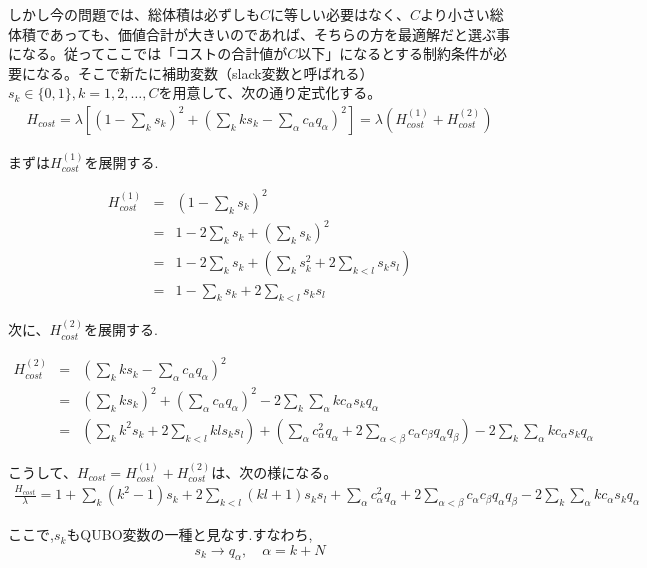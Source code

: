 \documentclass[uplatex,dvipdfmx,a4paper,11pt,oneside,openany]{jsbook}
\begin{document}
しかし今の問題では、総体積は必ずしも$C$に等しい必要はなく、$C$より小さい総体積であっても、価値合計が大きいのであれば、そちらの方を最適解だと選ぶ事になる。従ってここでは「コストの合計値が$C$以下」になるとする制約条件が必要になる。そこで新たに補助変数（slack変数と呼ばれる）$s_k \in \{0, 1\}, k=1,2,\dots,C$を用意して、次の通り定式化する。
\begin{eqnarray}
  H_{cost} = \lambda \left[\left(1-\sum_k s_k\right)^2+\left(\sum_k ks_k - \sum_\alpha c_\alpha q_\alpha\right)^2\right] = \lambda\left(H_{cost}^{(1)} + H_{cost}^{(2)}\right)
\end{eqnarray}

まずは$H_{cost}^{(1)}$を展開する.

\begin{eqnarray*}
H_{cost}^{(1)}&=&\left(1-\sum_k s_k\right)^2\\
&=&1-2\sum_k s_k + \left(\sum_k s_k\right)^2\\
&=&1-2\sum_k s_k + \left(\sum_k s_k^2 + 2\sum_{k<l}s_k s_l\right)\\
&=&1-\sum_k s_k + 2\sum_{k<l}s_k s_l
\end{eqnarray*}

次に、$H_{cost}^{(2)}$を展開する.

\begin{eqnarray*}
  H_{cost} ^{(2)} &=& \left( \sum _{k} k s_{k} - \sum _{\alpha} c_{\alpha} q_{\alpha} \right) ^{2} \\
  &=& \left( \sum _{k} k s_{k} \right) ^{2} + \left( \sum _{\alpha} c_{\alpha} q_{\alpha} \right) ^{2} - 2 \sum _{k} \sum _{\alpha} kc_{\alpha} s_{k} q_{\alpha} \\
  &=& \left(\sum _{k} k^{2} s_{k} + 2\sum _{k < l} kls_{k}s_{l}\right) + \left(\sum _{\alpha} c_{\alpha} ^{2} q_{\alpha} + 2\sum _{\alpha < \beta} c_{\alpha} c_{\beta} q_{\alpha} q_{\beta}\right) - 2 \sum_{k} \sum _{\alpha} kc_{\alpha} s_{k} q_{\alpha}
\end{eqnarray*}

こうして、$H_{cost}=H_{cost}^{(1)}+H_{cost}^{(2)}$は、次の様になる。
\begin{eqnarray*}
  \frac{H_{cost}}{\lambda } = 1 + \sum _{k} (k^{2} - 1) s_{k} + 2\sum _{k < l} (kl + 1) s_{k}s_{l} + \sum _{\alpha} c_{\alpha} ^{2} q_{\alpha} + 2\sum _{\alpha < \beta} c_{\alpha} c_{\beta} q_{\alpha} q_{\beta} - 2 \sum_{k} \sum _{\alpha} kc_{\alpha} s_{k} q_{\alpha}
\end{eqnarray*}


ここで,$s_k$もQUBO変数の一種と見なす.すなわち,
\[
s_{k} \longrightarrow q_{\alpha}, \quad \alpha = k + N
\]
\end{document}
